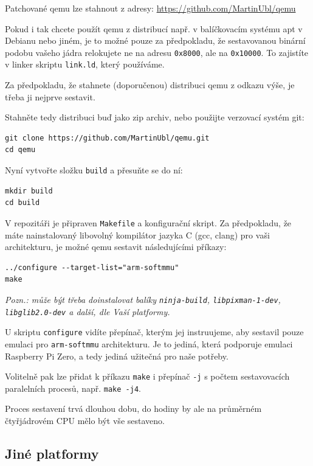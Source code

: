 \documentclass{article}
\begin{document}
Patchované qemu lze stahnout z adresy: \url{https://github.com/MartinUbl/qemu}

Pokud i tak chcete použít qemu z distribucí např. v balíčkovacím systému apt v Debianu nebo jiném, je to možné pouze za předpokladu, že sestavovanou binární podobu vašeho jádra relokujete ne na adresu {\tt 0x8000}, ale na {\tt 0x10000}. To zajistíte v linker skriptu {\tt link.ld}, který používáme.

Za předpokladu, že stahnete (doporučenou) distribuci qemu z odkazu výše, je třeba ji nejprve sestavit.

Stahněte tedy distribuci buď jako zip archiv, nebo použijte verzovací systém git:

\begin{verbatim}
git clone https://github.com/MartinUbl/qemu.git
cd qemu
\end{verbatim}

Nyní vytvořte složku {\tt build} a přesuňte se do ní:

\begin{verbatim}
mkdir build
cd build
\end{verbatim}

V repozitáři je připraven {\tt Makefile} a konfigurační skript. Za předpokladu, že máte nainstalovaný libovolný kompilátor jazyka C (gcc, clang) pro vaši architekturu, je možné qemu sestavit následujícími příkazy:

\begin{verbatim}
../configure --target-list="arm-softmmu"
make
\end{verbatim}

\emph{Pozn.: může být třeba doinstalovat balíky {\tt ninja-build}, {\tt libpixman-1-dev}, {\tt libglib2.0-dev} a další, dle Vaší platformy.}

U skriptu {\tt configure} vidíte přepínač, kterým jej instruujeme, aby sestavil pouze emulaci pro {\tt arm-softmmu} architekturu. Je to jediná, která podporuje emulaci Raspberry Pi Zero, a tedy jediná užitečná pro naše potřeby.

Volitelně pak lze přidat k příkazu {\tt make} i přepínač {\tt -j} s počtem sestavovacích paralelních procesů, např. {\tt make -j4}.

Proces sestavení trvá dlouhou dobu, do hodiny by ale na průměrném čtyřjádrovém CPU mělo být vše sestaveno.

\subsection{Jiné platformy}
\end{document}
